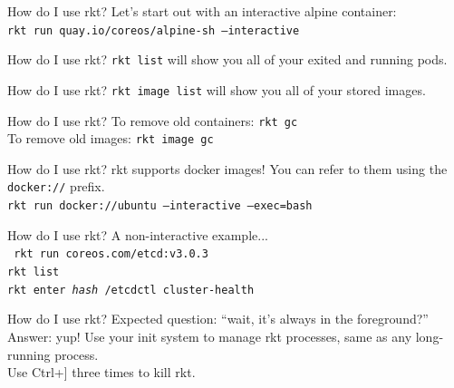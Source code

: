 \documentclass[pdf,aspectratio=169]{beamer}
\begin{document}
\begin{frame}{How do I use rkt?}
    Let's start out with an interactive alpine container: \\
    \texttt{rkt run quay.io/coreos/alpine-sh --interactive}
\end{frame}

\begin{frame}{How do I use rkt?}
    \texttt{rkt list} will show you all of your exited and running pods.
\end{frame}

\begin{frame}{How do I use rkt?}
    \texttt{rkt image list} will show you all of your stored images.
\end{frame}

\begin{frame}{How do I use rkt?}
    To remove old containers: \texttt{rkt gc} \\
    To remove old images: \texttt{rkt image gc}
\end{frame}

\begin{frame}{How do I use rkt?}
    rkt supports docker images! You can refer to them using the
    \texttt{docker://} prefix. \\
    \vspace{1em}
    \texttt{rkt run docker://ubuntu --interactive --exec=bash} 
\end{frame}

\begin{frame}{How do I use rkt?}
    A non-interactive example... \\
    \vspace{1em}
    \texttt{\noindent
        rkt run coreos.com/etcd:v3.0.3 \\
        rkt list \\
        rkt enter \textit{hash} /etcdctl cluster-health
    }
\end{frame}

\begin{frame}{How do I use rkt?}
    Expected question: ``wait, it's always in the foreground?'' \\
    \pause
    \vspace{1em}
    Answer: yup! Use your init system to manage rkt processes, same as any
    long-running process. \\
    Use Ctrl+] three times to kill rkt.
\end{frame}
\end{document}
